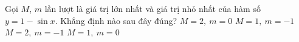 \begin{ex}%
	Gọi $M$, $m$ lần lượt là giá trị lớn nhất và giá trị nhỏ nhất của hàm số $y=1-\sin x$. Khẳng định nào sau đây đúng?
	\choice
	{\True $M=2,~m=0$}
	{$M=1,~m=-1$}
	{$M=2,~m=-1$}
	{$M=1,~m=0$}
\end{ex}